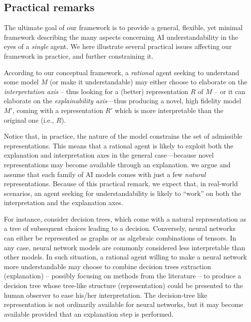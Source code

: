 \documentclass[12pt,a4paper,openright,twoside]{book}
\begin{document}
\subsection{Practical remarks}

The ultimate goal of our framework is to provide a general, flexible, yet minimal framework describing the many aspects concerning AI understandability in the eyes of a \emph{single} agent.
%
We here illustrate several practical issues affecting our framework in practice, and further constraining it.

According to our conceptual framework, a \emph{rational} agent seeking to understand some model $M$ (or make it understandable) may either choose to elaborate on the \emph{interpretation axis} -- thus looking for a (better) representation $R$ of $M$ -- or it can elaborate on the \emph{explainability axis}---thus producing a novel, high fidelity model $M'$, coming with a representation $R'$ which is more interpretable than the original one (i.e., $R$).

Notice that, in practice, the nature of the model constrains the set of admissible representations.
%
This means that a rational agent is likely to exploit both the explanation and interpretation axes in the general case---because novel representations may become available through an explanation.
%
we argue and assume that each family of AI models comes with just a few \emph{natural} representations.
%
Because of this practical remark, we expect that, in real-world scenarios, an agent seeking for understandability is likely to ``work'' on both the interpretation and the explanation axes.

For instance, consider decision trees, which come with a natural representation as a tree of subsequent choices leading to a decision.
%
Conversely, neural networks can either be represented as graphs or as algebraic combinations of tensors.
%
In any case, neural network models are commonly considered less interpretable than other models.
%
In such situation, a rational agent willing to make a neural network more understandable may choose to combine decision trees extraction (explanation) -- possibly focusing on methods from the literature \cite{AndrewsDT95,xailp-woa2019} -- to produce a decision tree whose tree-like structure (representation) could be presented to the human observer to ease his/her interpretation.
%
The decision-tree like representation is not ordinarily available for neural networks, but it may become available provided that an explanation step is performed.
\end{document}
